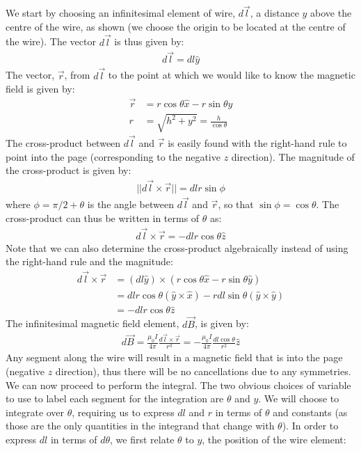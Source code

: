 We start by choosing an infinitesimal element of wire, $d\vec l$, a distance $y$ above the centre of the wire, as shown (we choose the origin to be located at the centre of the wire). The vector $d\vec l$ is thus given by:
\begin{align*}
d\vec l = dl\hat y
\end{align*}
The vector, $\vec r$, from $d\vec l$ to the point at which we would like to know the magnetic field is given by:
\begin{align*}
\vec r &= r\cos\theta\hat x -r\sin\theta\hat y\\
r &=\sqrt{h^2+y^2} =\frac{h}{\cos\theta}
\end{align*}
The cross-product between $d\vec l$ and $\vec r$ is easily found with the right-hand rule to point into the page (corresponding to the negative $z$ direction). The magnitude of the cross-product is given by:
\begin{align*}
||d\vec l \times \vec r||=dl r \sin\phi
\end{align*}
where $\phi=\pi/2+\theta$ is the angle between $d\vec l$ and $\vec r$, so that $\sin\phi=\cos\theta$. The cross-product can thus be written in terms of $\theta$ as:
\begin{align*}
d\vec l \times \vec r=-dl r \cos\theta \hat z
\end{align*}
Note that we can also determine the cross-product algebraically instead of using the right-hand rule and the magnitude:
\begin{align*}
d\vec l \times \vec r &= (dl\hat y) \times (r\cos\theta\hat x -r\sin\theta\hat y)\\
&=dlr\cos\theta (\hat y \times\hat x) - rdl\sin\theta(\hat y \times \hat y)\\
&=-dlr\cos\theta \hat z 
\end{align*}
The infinitesimal magnetic field element, $d\vec B$, is given by:
\begin{align*}
d\vec B = \frac{\mu_0 I}{4\pi}\frac{d\vec l\times \vec r}{r^3}=-\frac{\mu_0 I}{4\pi}\frac{dl\cos\theta}{r^2}\hat z
\end{align*}
Any segment along the wire will result in a magnetic field that is into the page (negative $z$ direction), thus there will be no cancellations due to any symmetries. We can now proceed to perform the integral. The two obvious choices of variable to use to label each segment for the integration are $\theta$ and $y$. We will choose to integrate over $\theta$, requiring us to express $dl$ and $r$ in terms of $\theta$ and constants (as those are the only quantities in the integrand that change with $\theta$). In order to express $dl$ in terms of $d\theta$, we first relate $\theta$ to $y$, the position of the wire element:
